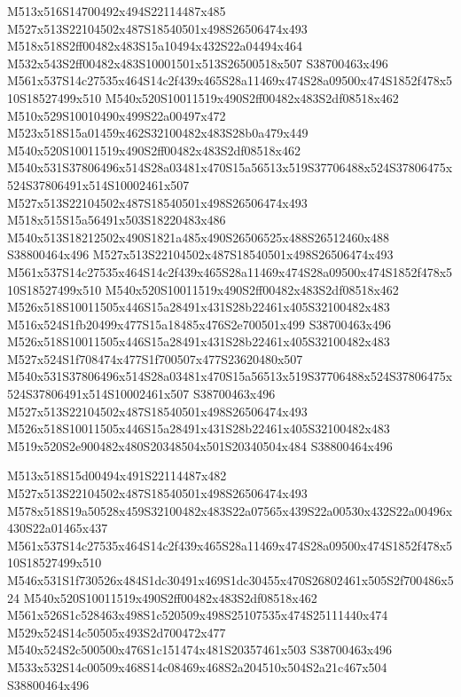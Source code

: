 \documentclass{article}
\begin{document}
\begin{multicols}{2}
M513x516S14700492x494S22114487x485 M527x513S22104502x487S18540501x498S26506474x493 M518x518S2ff00482x483S15a10494x432S22a04494x464 M532x543S2ff00482x483S10001501x513S26500518x507 S38700463x496 M561x537S14c27535x464S14c2f439x465S28a11469x474S28a09500x474S1852f478x510S18527499x510 M540x520S10011519x490S2ff00482x483S2df08518x462 M510x529S10010490x499S22a00497x472 M523x518S15a01459x462S32100482x483S28b0a479x449 M540x520S10011519x490S2ff00482x483S2df08518x462 M540x531S37806496x514S28a03481x470S15a56513x519S37706488x524S37806475x524S37806491x514S10002461x507 M527x513S22104502x487S18540501x498S26506474x493 M518x515S15a56491x503S18220483x486 M540x513S18212502x490S1821a485x490S26506525x488S26512460x488 S38800464x496 M527x513S22104502x487S18540501x498S26506474x493 M561x537S14c27535x464S14c2f439x465S28a11469x474S28a09500x474S1852f478x510S18527499x510 M540x520S10011519x490S2ff00482x483S2df08518x462 M526x518S10011505x446S15a28491x431S28b22461x405S32100482x483 M516x524S1fb20499x477S15a18485x476S2e700501x499 S38700463x496 M526x518S10011505x446S15a28491x431S28b22461x405S32100482x483 M527x524S1f708474x477S1f700507x477S23620480x507 M540x531S37806496x514S28a03481x470S15a56513x519S37706488x524S37806475x524S37806491x514S10002461x507 S38700463x496 M527x513S22104502x487S18540501x498S26506474x493 M526x518S10011505x446S15a28491x431S28b22461x405S32100482x483 M519x520S2e900482x480S20348504x501S20340504x484 S38800464x496

M513x518S15d00494x491S22114487x482 M527x513S22104502x487S18540501x498S26506474x493 M578x518S19a50528x459S32100482x483S22a07565x439S22a00530x432S22a00496x430S22a01465x437 M561x537S14c27535x464S14c2f439x465S28a11469x474S28a09500x474S1852f478x510S18527499x510 M546x531S1f730526x484S1dc30491x469S1dc30455x470S26802461x505S2f700486x524 M540x520S10011519x490S2ff00482x483S2df08518x462 M561x526S1c528463x498S1c520509x498S25107535x474S25111440x474 M529x524S14c50505x493S2d700472x477 M540x524S2c500500x476S1c151474x481S20357461x503 S38700463x496 M533x532S14c00509x468S14c08469x468S2a204510x504S2a21c467x504 S38800464x496


\end{multicols}
\end{document}
